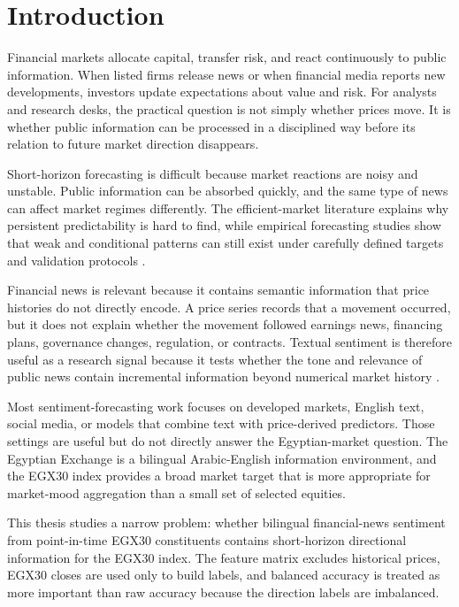 \chapter{Introduction}
\label{chap:intro}

Financial markets allocate capital, transfer risk, and react continuously to public information. When listed firms release news or when financial media reports new developments, investors update expectations about value and risk. For analysts and research desks, the practical question is not simply whether prices move. It is whether public information can be processed in a disciplined way before its relation to future market direction disappears.

Short-horizon forecasting is difficult because market reactions are noisy and unstable. Public information can be absorbed quickly, and the same type of news can affect market regimes differently. The efficient-market literature explains why persistent predictability is hard to find, while empirical forecasting studies show that weak and conditional patterns can still exist under carefully defined targets and validation protocols \cite{fama1970, lo1988randomwalk, sezer2020dlreview}.

Financial news is relevant because it contains semantic information that price histories do not directly encode. A price series records that a movement occurred, but it does not explain whether the movement followed earnings news, financing plans, governance changes, regulation, or contracts. Textual sentiment is therefore useful as a research signal because it tests whether the tone and relevance of public news contain incremental information beyond numerical market history \cite{tetlock2007media, kearney2014survey}.

Most sentiment-forecasting work focuses on developed markets, English text, social media, or models that combine text with price-derived predictors. Those settings are useful but do not directly answer the Egyptian-market question. The Egyptian Exchange is a bilingual Arabic-English information environment, and the EGX30 index provides a broad market target that is more appropriate for market-mood aggregation than a small set of selected equities.

This thesis studies a narrow problem: whether bilingual financial-news sentiment from point-in-time EGX30 constituents contains short-horizon directional information for the EGX30 index. The feature matrix excludes historical prices, EGX30 closes are used only to build labels, and balanced accuracy is treated as more important than raw accuracy because the direction labels are imbalanced.

